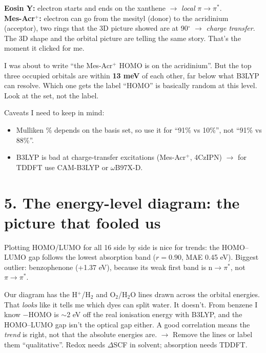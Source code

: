 \documentclass[11pt,a4paper]{article}
\begin{document}
\begin{aha}
\textbf{Eosin Y:} electron starts and ends on the xanthene $\to$ \emph{local} $\pi\to\pi^*$.\\
\textbf{Mes-Acr$^+$:} electron can go from the mesityl (donor) to the acridinium (acceptor), two
rings that the 3D picture showed are at 90$^\circ$ $\to$ \emph{charge transfer}. The 3D shape
and the orbital picture are telling the same story. That's the moment it clicked for me.
\end{aha}

\begin{oops}
I was about to write ``the Mes-Acr$^+$ HOMO is on the acridinium''. But the top three occupied
orbitals are within \textbf{13 meV} of each other, far below what B3LYP can resolve. Which one
gets the label ``HOMO'' is basically random at this level. Look at the set, not the label.
\end{oops}

Caveats I need to keep in mind:
\begin{itemize}
  \item Mulliken \% depends on the basis set, so use it for ``91\% vs 10\%'', not ``91\% vs 88\%''.
  \item B3LYP is bad at charge-transfer excitations (Mes-Acr$^+$, 4CzIPN) $\to$ for TDDFT use
  CAM-B3LYP or $\omega$B97X-D.
\end{itemize}

\section*{5. The energy-level diagram: the picture that fooled us}

Plotting HOMO/LUMO for all 16 side by side is nice for trends: the HOMO--LUMO gap follows the
lowest absorption band ($r = 0.90$, MAE 0.45 eV). Biggest outlier: benzophenone (+1.37 eV),
because its weak first band is n$\to\pi^*$, not $\pi\to\pi^*$.

\begin{oops}
Our diagram has the H$^+$/H$_2$ and O$_2$/H$_2$O lines drawn across the orbital energies. That
\emph{looks} like it tells me which dyes can split water. It doesn't. From benzene I know
$-$HOMO is $\sim$2 eV off the real ionisation energy with B3LYP, and the HOMO--LUMO gap isn't the
optical gap either. A good correlation means the \emph{trend} is right, not that the absolute
energies are. $\to$ Remove the lines or label them ``qualitative''. Redox needs $\Delta$SCF in
solvent; absorption needs TDDFT.
\end{oops}
\end{document}
